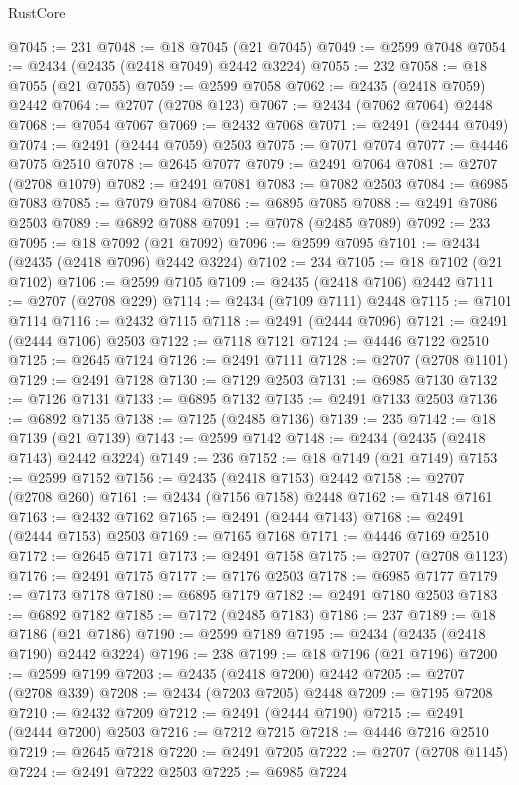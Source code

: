 \begin{lexlean}{RustCore}
\begin{coremodule}
@7045 := 231
@7048 := @18 @7045 (@21 @7045)
@7049 := @2599 @7048
@7054 := @2434 (@2435 (@2418 @7049) @2442 @3224)
@7055 := 232
@7058 := @18 @7055 (@21 @7055)
@7059 := @2599 @7058
@7062 := @2435 (@2418 @7059) @2442
@7064 := @2707 (@2708 @123)
@7067 := @2434 (@7062 @7064) @2448
@7068 := @7054 @7067
@7069 := @2432 @7068
@7071 := @2491 (@2444 @7049)
@7074 := @2491 (@2444 @7059) @2503
@7075 := @7071 @7074
@7077 := @4446 @7075 @2510
@7078 := @2645 @7077
@7079 := @2491 @7064
@7081 := @2707 (@2708 @1079)
@7082 := @2491 @7081
@7083 := @7082 @2503
@7084 := @6985 @7083
@7085 := @7079 @7084
@7086 := @6895 @7085
@7088 := @2491 @7086 @2503
@7089 := @6892 @7088
@7091 := @7078 (@2485 @7089)
@7092 := 233
@7095 := @18 @7092 (@21 @7092)
@7096 := @2599 @7095
@7101 := @2434 (@2435 (@2418 @7096) @2442 @3224)
@7102 := 234
@7105 := @18 @7102 (@21 @7102)
@7106 := @2599 @7105
@7109 := @2435 (@2418 @7106) @2442
@7111 := @2707 (@2708 @229)
@7114 := @2434 (@7109 @7111) @2448
@7115 := @7101 @7114
@7116 := @2432 @7115
@7118 := @2491 (@2444 @7096)
@7121 := @2491 (@2444 @7106) @2503
@7122 := @7118 @7121
@7124 := @4446 @7122 @2510
@7125 := @2645 @7124
@7126 := @2491 @7111
@7128 := @2707 (@2708 @1101)
@7129 := @2491 @7128
@7130 := @7129 @2503
@7131 := @6985 @7130
@7132 := @7126 @7131
@7133 := @6895 @7132
@7135 := @2491 @7133 @2503
@7136 := @6892 @7135
@7138 := @7125 (@2485 @7136)
@7139 := 235
@7142 := @18 @7139 (@21 @7139)
@7143 := @2599 @7142
@7148 := @2434 (@2435 (@2418 @7143) @2442 @3224)
@7149 := 236
@7152 := @18 @7149 (@21 @7149)
@7153 := @2599 @7152
@7156 := @2435 (@2418 @7153) @2442
@7158 := @2707 (@2708 @260)
@7161 := @2434 (@7156 @7158) @2448
@7162 := @7148 @7161
@7163 := @2432 @7162
@7165 := @2491 (@2444 @7143)
@7168 := @2491 (@2444 @7153) @2503
@7169 := @7165 @7168
@7171 := @4446 @7169 @2510
@7172 := @2645 @7171
@7173 := @2491 @7158
@7175 := @2707 (@2708 @1123)
@7176 := @2491 @7175
@7177 := @7176 @2503
@7178 := @6985 @7177
@7179 := @7173 @7178
@7180 := @6895 @7179
@7182 := @2491 @7180 @2503
@7183 := @6892 @7182
@7185 := @7172 (@2485 @7183)
@7186 := 237
@7189 := @18 @7186 (@21 @7186)
@7190 := @2599 @7189
@7195 := @2434 (@2435 (@2418 @7190) @2442 @3224)
@7196 := 238
@7199 := @18 @7196 (@21 @7196)
@7200 := @2599 @7199
@7203 := @2435 (@2418 @7200) @2442
@7205 := @2707 (@2708 @339)
@7208 := @2434 (@7203 @7205) @2448
@7209 := @7195 @7208
@7210 := @2432 @7209
@7212 := @2491 (@2444 @7190)
@7215 := @2491 (@2444 @7200) @2503
@7216 := @7212 @7215
@7218 := @4446 @7216 @2510
@7219 := @2645 @7218
@7220 := @2491 @7205
@7222 := @2707 (@2708 @1145)
@7224 := @2491 @7222 @2503
@7225 := @6985 @7224

\end{coremodule}
\end{lexlean}
